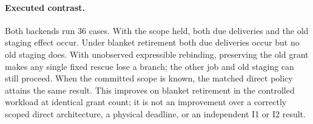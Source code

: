 \documentclass{article}
\begin{document}
\paragraph{Executed contrast.}
Both backends run 36 cases. With the scope held, both due
deliveries and the old staging effect occur. Under blanket
retirement both due deliveries occur but no old staging does.
With unobserved expressible rebinding, preserving the old grant
makes any single fixed rescue lose a branch; the other job and
old staging can still proceed. When the committed scope is known,
the matched direct policy attains the same result. This improves
on blanket retirement in the controlled workload at identical
grant count; it is not an improvement over a correctly scoped
direct architecture, a physical deadline, or an independent
I1 or I2 result.
\end{document}

